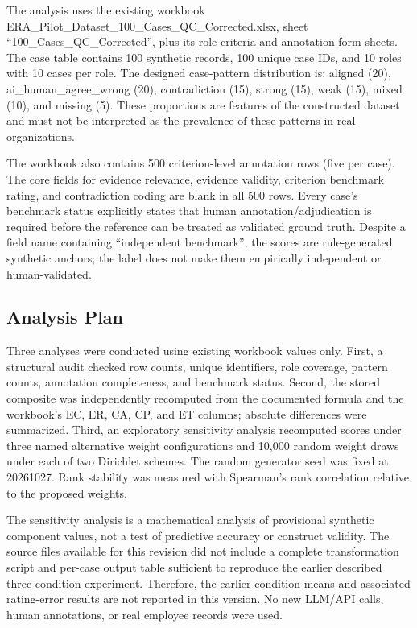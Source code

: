\documentclass[
  10pt,
  runningheads]{llncs}
\begin{document}
The analysis uses the existing workbook
ERA\_Pilot\_Dataset\_100\_Cases\_QC\_Corrected.xlsx, sheet
``100\_Cases\_QC\_Corrected'', plus its role-criteria and
annotation-form sheets. The case table contains 100 synthetic records,
100 unique case IDs, and 10 roles with 10 cases per role. The designed
case-pattern distribution is: aligned (20), ai\_human\_agree\_wrong
(20), contradiction (15), strong (15), weak (15), mixed (10), and
missing (5). These proportions are features of the constructed dataset
and must not be interpreted as the prevalence of these patterns in real
organizations.

The workbook also contains 500 criterion-level annotation rows (five per
case). The core fields for evidence relevance, evidence validity,
criterion benchmark rating, and contradiction coding are blank in all
500 rows. Every case's benchmark status explicitly states that human
annotation/adjudication is required before the reference can be treated
as validated ground truth. Despite a field name containing ``independent
benchmark'', the scores are rule-generated synthetic anchors; the label
does not make them empirically independent or human-validated.

\subsection{Analysis Plan}\label{analysis-plan}

Three analyses were conducted using existing workbook values only.
First, a structural audit checked row counts, unique identifiers, role
coverage, pattern counts, annotation completeness, and benchmark status.
Second, the stored composite was independently recomputed from the
documented formula and the workbook's EC, ER, CA, CP, and ET columns;
absolute differences were summarized. Third, an exploratory sensitivity
analysis recomputed scores under three named alternative weight
configurations and 10,000 random weight draws under each of two
Dirichlet schemes. The random generator seed was fixed at 20261027. Rank
stability was measured with Spearman's rank correlation relative to the
proposed weights.

The sensitivity analysis is a mathematical analysis of provisional
synthetic component values, not a test of predictive accuracy or
construct validity. The source files available for this revision did not
include a complete transformation script and per-case output table
sufficient to reproduce the earlier described three-condition
experiment. Therefore, the earlier condition means and associated
rating-error results are not reported in this version. No new LLM/API
calls, human annotations, or real employee records were used.
\end{document}

